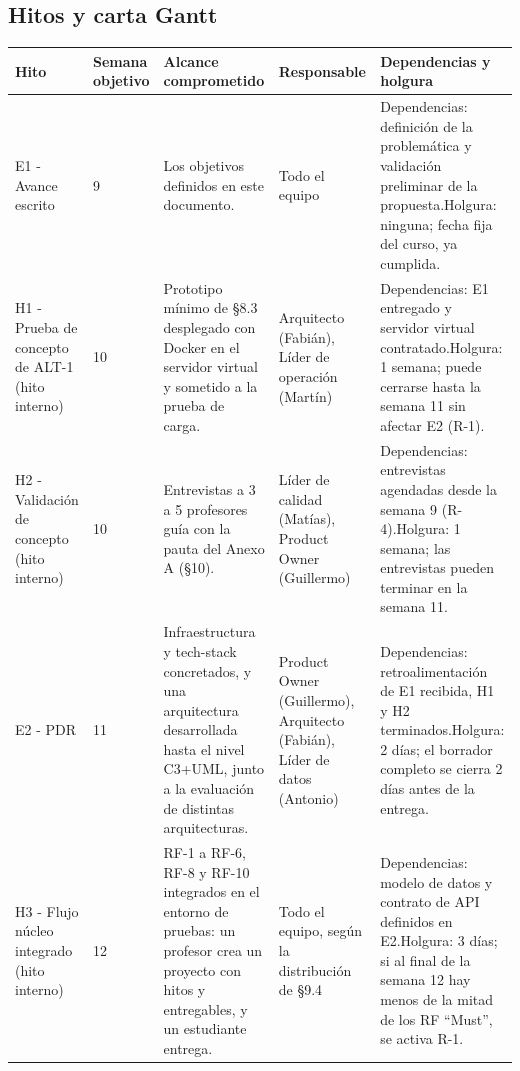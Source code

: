 \documentclass[10pt,a4paper]{article}
\newcommand{\hrow}{\rowcolor{encabezado}}
\newcommand{\h}[1]{\textbf{#1}}
\begin{document}
\subsection{Hitos y carta Gantt}
\begin{xltabular}{\linewidth}{|P{3.4cm}|P{1.8cm}|L|P{2.6cm}|P{3.2cm}|}
\hline\hrow \h{Hito} & \h{Semana objetivo} & \h{Alcance comprometido} & \h{Responsable} & \h{Dependencias y holgura} \\ \hline
\endhead
E1 - Avance escrito & 9 & Los objetivos definidos en este documento. & Todo el equipo & Dependencias: definición de la problemática y validación preliminar de la propuesta.\newline Holgura: ninguna; fecha fija del curso, ya cumplida. \\ \hline
H1 - Prueba de concepto de ALT-1 (hito interno) & 10 & Prototipo mínimo de §8.3 desplegado con Docker en el servidor virtual y sometido a la prueba de carga. & Arquitecto (Fabián), Líder de operación (Martín) & Dependencias: E1 entregado y servidor virtual contratado.\newline Holgura: 1 semana; puede cerrarse hasta la semana 11 sin afectar E2 (R-1). \\ \hline
H2 - Validación de concepto (hito interno) & 10 & Entrevistas a 3 a 5 profesores guía con la pauta del Anexo A (§10). & Líder de calidad (Matías), Product Owner (Guillermo) & Dependencias: entrevistas agendadas desde la semana 9 (R-4).\newline Holgura: 1 semana; las entrevistas pueden terminar en la semana 11. \\ \hline
E2 - PDR & 11 & Infraestructura y tech-stack concretados, y una arquitectura desarrollada hasta el nivel C3+UML, junto a la evaluación de distintas arquitecturas. & Product Owner (Guillermo), Arquitecto (Fabián), Líder de datos (Antonio) & Dependencias: retroalimentación de E1 recibida, H1 y H2 terminados.\newline Holgura: 2 días; el borrador completo se cierra 2 días antes de la entrega. \\ \hline
H3 - Flujo núcleo integrado (hito interno) & 12 & RF-1 a RF-6, RF-8 y RF-10 integrados en el entorno de pruebas: un profesor crea un proyecto con hitos y entregables, y un estudiante entrega. & Todo el equipo, según la distribución de §9.4 & Dependencias: modelo de datos y contrato de API definidos en E2.\newline Holgura: 3 días; si al final de la semana 12 hay menos de la mitad de los RF ``Must'', se activa R-1. \\ \hline

\end{xltabular}
\end{document}
